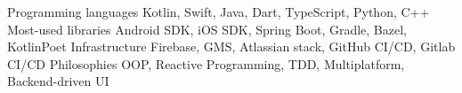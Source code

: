 
\begin{cvskills}
    \cvskill
        {Programming languages}
        {Kotlin, Swift, Java, Dart, TypeScript, Python, C++}
    \cvskill
        {Most-used libraries} 
        {Android SDK, iOS SDK, Spring Boot, Gradle, Bazel, KotlinPoet}
    \cvskill
        {Infrastructure}
        {Firebase, GMS, Atlassian stack, GitHub CI/CD, Gitlab CI/CD}
    \cvskill
        {Philosophies}
        {OOP, Reactive Programming, TDD, Multiplatform, Backend-driven UI}
\end{cvskills}